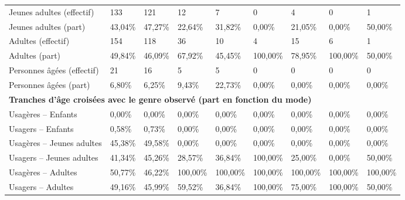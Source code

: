 \begin{longtable}{p{3.7cm}p{0.9cm}p{0.9cm}p{0.9cm}p{0.9cm}p{0.9cm}p{0.9cm}p{0.9cm}p{0.9cm}}
    \small{Jeunes adultes (effectif)} & \small{133} & \small{121} & \small{12} & \small{7} & \small{0} & \small{4} & \small{0} & \small{1}\\    
    \small{Jeunes adultes (part)} & \small{43,04\%} & \small{47,27\%} & \small{22,64\%} & \small{31,82\%} & \small{0,00\%} & \small{21,05\%} & \small{0,00\%} & \small{50,00\%}\\    
    \small{Adultes (effectif)} & \small{154} & \small{118} & \small{36} & \small{10} & \small{4} & \small{15} & \small{6} & \small{1}\\    
    \small{Adultes (part)} & \small{49,84\%} & \small{46,09\%} & \small{67,92\%} & \small{45,45\%} & \small{100,00\%} & \small{78,95\%} & \small{100,00\%} & \small{50,00\%}\\   
    \small{Personnes âgées (effectif)} & \small{21} & \small{16} & \small{5} & \small{5} & \small{0} & \small{0} & \small{0} & \small{0}\\    
    \small{Personnes âgées (part)} & \small{6,80\%} & \small{6,25\%} & \small{9,43\%} & \small{22,73\%} & \small{0,00\%} & \small{0,00\%} & \small{0,00\%} & \small{0,00\%}\\
    \hline
\multicolumn{9}{l}{\textbf{Tranches d'âge croisées avec le genre observé (part en fonction du mode)}}\\
    \small{Usagères – Enfants} & \small{0,00\%} & \small{0,00\%} & \small{0,00\%} & \small{0,00\%} & \small{0,00\%} & \small{0,00\%} & \small{0,00\%} & \small{0,00\%}\\   
    \small{Usagers – Enfants} & \small{0,58\%} & \small{0,73\%} & \small{0,00\%} & \small{0,00\%} & \small{0,00\%} & \small{0,00\%} & \small{0,00\%} & \small{0,00\%}\\    
    \small{Usagères – Jeunes adultes} & \small{45,38\%} & \small{49,58\%} & \small{0,00\%} & \small{0,00\%} & \small{0,00\%} & \small{0,00\%} & \small{0,00\%} & \small{0,00\%}\\   
    \small{Usagers – Jeunes adultes} & \small{41,34\%} & \small{45,26\%} & \small{28,57\%} & \small{36,84\%} & \small{100,00\%} & \small{25,00\%} & \small{0,00\%} & \small{50,00\%}\\    
    \small{Usagères – Adultes} & \small{50,77\%} & \small{46,22\%} & \small{100,00\%} & \small{100,00\%} & \small{100,00\%} & \small{100,00\%} & \small{100,00\%} & \small{100,00\%}\\    
    \small{Usagers – Adultes} & \small{49,16\%} & \small{45,99\%} & \small{59,52\%} & \small{36,84\%} & \small{100,00\%} & \small{75,00\%} & \small{100,00\%} & \small{50,00\%}\\    

\end{longtable}
